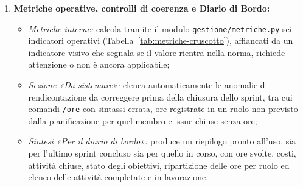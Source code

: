 \documentclass[documento]{gpt}
\begin{document}
\begin{enumerate}
\begin{itemize}
			\textit{Piano di Progetto};
			\item \textit{Diagrammi di Gantt:} genera nella stessa cartella
			\texttt{.github-private/tabelle/} i  in \LaTeX{}
			(basati sul pacchetto \texttt{pgfgantt}) a partire dai dati di
			\texttt{pianificazione.toml}. In particolare produce
			\texttt{gantt-progetto.tex}, che mostra tutti gli sprint raggruppati
			per fase (RTB e PB) insieme alle scadenze come traguardi. Genera
			inoltre un file \texttt{gantt-sprint-N.tex} per ogni sprint dotato di
			obiettivi, con le relative barre e i traguardi dell'incontro
			settimanale.
			I file generati vengono copiati nella cartella \texttt{tabelle/} del
			\textit{Piano di Progetto} a inizio sprint, insieme al preventivo,
			e inclusi tramite \texttt{\textbackslash input\{tabelle/gantt-progetto\}} o \texttt{\textbackslash input\{tabelle/gantt-sprint-N\}}, così
			da congelare la pianificazione iniziale del periodo.
		\end{itemize}
		\item \textbf{Metriche operative, controlli di coerenza e Diario di Bordo:}
		\begin{itemize}
			\item \textit{Metriche interne:} calcola tramite il modulo
			\texttt{gestione/metriche.py} sei indicatori operativi
			(Tabella~\ref{tab:metriche-cruscotto}), affiancati da un indicatore
			visivo che segnala se il valore rientra nella norma, richiede
			attenzione o non è ancora applicabile;
			\item \textit{Sezione «Da sistemare»:} elenca automaticamente le anomalie
			di rendicontazione da correggere prima della chiusura dello sprint,
			tra cui comandi \texttt{/ore} con sintassi errata, ore registrate in
			un ruolo non previsto dalla pianificazione per quel membro e issue
			chiuse senza ore;
			\item \textit{Sintesi «Per il diario di bordo»:} produce un riepilogo
			pronto all'uso, sia per l'ultimo sprint concluso sia per quello in
			corso, con ore svolte, costi, attività chiuse, stato degli
			obiettivi, ripartizione delle ore per ruolo ed elenco delle
			attività completate e in lavorazione.
		\end{itemize}
	\end{enumerate}
	
\end{document}

